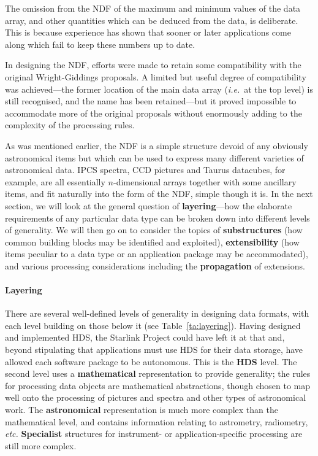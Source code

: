 \documentclass[twoside,11pt]{article}
\begin{document}
The omission from the NDF of the maximum and minimum
values of the data array, and other quantities which can be
deduced from the data, is deliberate.  This is
because experience has shown that sooner or later
applications come along which fail to keep these
numbers up to date.

In designing the NDF, efforts were made
to retain some compatibility
with the original Wright-Giddings proposals.  A limited but
useful degree of compatibility was achieved---the former
location of the main data array ({\it i.e.}\ at the top level) is
still recognised, and the name has been
retained---but it proved impossible to accommodate more
of the original proposals without enormously
adding to the complexity of the processing rules.

As was mentioned earlier, the NDF is a simple structure devoid
of any obviously astronomical items but which can be used
to express many different varieties of astronomical
data.  IPCS spectra, CCD pictures and Taurus datacubes, for example,
are all essentially $n$-dimensional arrays together with
some ancillary items, and fit naturally into the
form of the NDF, simple though it is.
In the next section, we will look at the
general question of {\bf layering}---how the
elaborate requirements of any particular data type can
be broken down into different levels of generality.  We
will then go on to consider
the topics of {\bf substructures} (how
common building blocks may be identified and exploited),
{\bf extensibility} (how items peculiar to a data type
or an application package may be accommodated), and
various processing considerations including the
{\bf propagation} of extensions.

\paragraph{Layering}
There are several well-defined levels of generality in designing
data formats, with each level building on those below it (see
Table~\ref{ta:layering}).  Having designed and implemented
HDS, the Starlink Project could have left it at that and,
beyond stipulating that applications must use HDS for their
data storage, have allowed each software package
to be autonomous.
This is the {\bf HDS} level.
The second level uses a {\bf mathematical}
representation to provide generality;  the rules for processing data
objects are mathematical abstractions, though chosen to map
well onto the processing of pictures and spectra and other
types of astronomical work.  The {\bf astronomical}
representation is much more complex than the mathematical level,
and contains information relating to astrometry, radiometry,
{\it etc.}
{\bf Specialist} structures for instrument- or application-specific
processing are still more complex.
\end{document}

